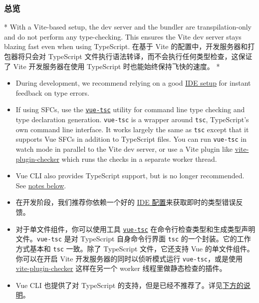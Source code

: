 \begin{paracol}{2}
\subsubsection{总览}
\switchcolumn[0]*%
With a Vite-based setup, the dev server and the bundler are
transpilation-only and do not perform any type-checking. This ensures
the Vite dev server stays blazing fast even when using TypeScript.
\switchcolumn
在基于 Vite 的配置中，开发服务器和打包器将只会对 TypeScript
文件执行语法转译，而不会执行任何类型检查，这保证了 Vite 开发服务器在使用
TypeScript 时也能始终保持飞快的速度。
\switchcolumn[0]*%
\begin{itemize}
\item
  During development, we recommend relying on a good
  \href{https://vuejs.org/guide/typescript/overview.html\#ide-support}{IDE
  setup} for instant feedback on type errors.
\item
  If using SFCs, use the
  \href{https://github.com/vuejs/language-tools/tree/master/packages/tsc}{\texttt{vue-tsc}}
  utility for command line type checking and type declaration
  generation. \texttt{vue-tsc} is a wrapper around \texttt{tsc},
  TypeScript's own command line interface. It works largely the same as
  \texttt{tsc} except that it supports Vue SFCs in addition to
  TypeScript files. You can run \texttt{vue-tsc} in watch mode in
  parallel to the Vite dev server, or use a Vite plugin like
  \href{https://vite-plugin-checker.netlify.app/}{vite-plugin-checker}
  which runs the checks in a separate worker thread.
\item
  Vue CLI also provides TypeScript support, but is no longer
  recommended. See
  \href{https://vuejs.org/guide/typescript/overview.html\#note-on-vue-cli-and-ts-loader}{notes
  below}.
\end{itemize}
\switchcolumn
\begin{itemize}
\item
  在开发阶段，我们推荐你依赖一个好的
  \href{https://cn.vuejs.org/guide/typescript/overview.html\#ide-support}{IDE
  配置}来获取即时的类型错误反馈。
\item
  对于单文件组件，你可以使用工具
  \href{https://github.com/vuejs/language-tools/tree/master/packages/tsc}{\texttt{vue-tsc}}
  在命令行检查类型和生成类型声明文件。\texttt{vue-tsc} 是对 TypeScript
  自身命令行界面 \texttt{tsc} 的一个封装。它的工作方式基本和
  \texttt{tsc} 一致。除了 TypeScript 文件，它还支持 Vue
  的单文件组件。你可以在开启 Vite 开发服务器的同时以侦听模式运行
  \texttt{vue-tsc}，或是使用
  \href{https://vite-plugin-checker.netlify.app/}{vite-plugin-checker}
  这样在另一个 worker 线程里做静态检查的插件。
\item
  Vue CLI 也提供了对 TypeScript
  的支持，但是已经不推荐了。详见\href{https://cn.vuejs.org/guide/typescript/overview.html\#note-on-vue-cli-and-ts-loader}{下方的说明}。
\end{itemize}
\end{paracol}



